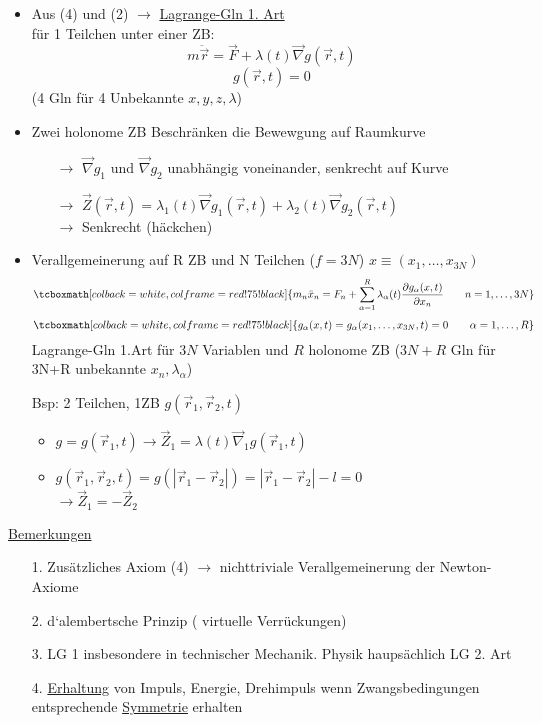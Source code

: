 \documentclass[titlepage,12pt,a4paper,ngerman]{report}
\newcommand{\rmbox}[1]{\tcboxmath[colback=white,colframe=red!75!black]{#1}} %
\renewcommand{\boxed}{\rmbox}
\begin{document}
\begin{itemize}
	\item Aus (4) und (2) $ \rightarrow $ \underline{Lagrange-Gln 1. Art}\\
	für 1 Teilchen unter einer ZB:\\
	\begin{equation*}
	m\ddot{\vec{r}} = \vec{F} + \lambda(t) \vec{\nabla} g(\vec{r},t) \tag{5}
	\end{equation*}
	$$g(\vec{r},t) = 0$$
	(4 Gln für 4 Unbekannte $x,y,z,\lambda$)
	\item Zwei holonome ZB Beschränken die Bewewgung auf Raumkurve
	\begin{itemize}
		\item[$ \rightarrow $] $ \vec{\nabla}g_1 $ und $ \vec{\nabla}g_2 $ unabhängig voneinander, senkrecht auf Kurve
		\item[$ \rightarrow $] $ \vec{Z} (\vec{r},t) = \lambda_1(t) \vec{\nabla}g_1(\vec{r},t) + \lambda_2(t) \vec{\nabla}g_2(\vec{r},t) $\\
		$ \rightarrow $ Senkrecht (häckchen)
	\end{itemize}
	\item Verallgemeinerung auf R ZB und N Teilchen ($ f=3N $) $ x \equiv(x_1,\dots,x_{3N}) $
	$$\boxed{m_n \ddot{x}_n = F_n + \sum_{\alpha = 1}^{R} \lambda_\alpha(t) \frac{\partial g_\alpha(x,t)}{\partial x_n} \qquad n = 1,\dots , 3N}$$
	$$\boxed{g_\alpha (x,t) = g_\alpha (x_1,\dots , x_{3N},t) = 0 \qquad \alpha = 1, \dots , R}$$
	Lagrange-Gln 1.Art für $3N$ Variablen und $R$ holonome ZB ($3N+R$ Gln für 3N+R unbekannte $ x_n, \lambda_\alpha $)
	\item[Bsp:] 2 Teilchen, 1ZB $ g(\vec{r}_1,\vec{r}_2,t) $\\
	\begin{itemize}
		\item $ g = g(\vec{r}_1,t) \rightarrow \vec{Z}_1 = \lambda(t) \vec{\nabla}_1 g(\vec{r}_1,t) $
		\item $ g(\vec{r}_1,\vec{r}_2,t) = g(|\vec{r}_1 - \vec{r}_2|) = |\vec{r}_1 - \vec{r}_2| -l = 0 $\\
		$ \rightarrow \vec{Z}_1 = - \vec{Z}_2 $
	\end{itemize}
\end{itemize}
\underline{Bemerkungen}\\
\begin{itemize}
	\item[1.] Zusätzliches Axiom (4) $ \rightarrow $ nichttriviale Verallgemeinerung der Newton-Axiome
	\item[2.] d`alembertsche Prinzip ( virtuelle Verrückungen)
	\item[3.] LG 1 insbesondere in technischer Mechanik. Physik haupsächlich LG 2. Art
	\item[4.] \underline{Erhaltung} von Impuls, Energie, Drehimpuls wenn Zwangsbedingungen entsprechende \underline{Symmetrie} erhalten
\end{itemize}
\end{document}

